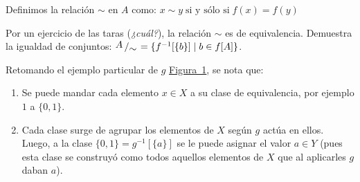 \documentclass[letterpaper,DIV=14,headsepline,12pt]{scrartcl}
\newcommand{\pts}{}
\newenvironment{ejercicio}[1]{\ifthenelse{\equal{#1}{1} \OR
\equal{#1}{+1}}{\renewcommand{\pts}{\textbf{(#1
pt)}}}{\renewcommand{\pts}{\textbf{(#1 pts)}}}\begin{ejj}\upshape
\pts}{\end{ejj}}
\newcommand{\quot}[2]{{\raisebox{.2em}{$#1$}\left/\raisebox{-.2em}{$#2$}\right.}}
\begin{document}
    \begin{definicion}
        Definimos la relación $\sim$ en $A$ como: $ x \sim y \; \text{si y sólo
        si} \; f(x)=f(y)$
    \end{definicion}

    \begin{ejercicio}{1.5}\label{ej:rela} Por un ejercicio de las taras
        (\textit{¿cuál?}), la relación $\sim$ es de equivalencia. Demuestra la
        igualdad de conjuntos: $\quot{A}{\sim}=\{ f^{-1}[\{b\}] \mid b \in f[A]
        \}$.
    \end{ejercicio}

    Retomando el ejemplo particular de $g$ \hyperref[fig:ejemplo]{Figura~1}, se
    nota que:
    \begin{enumerate}
        \item Se puede mandar cada elemento $x\in X$ a su clase de equivalencia,
        por ejemplo $1$ a $\{0,1\}$.
        \item Cada clase surge de agrupar los elementos de $X$ según $g$ actúa
        en ellos. Luego, a la clase $\{0,1\}=g^{-1}[\{a\}]$ se le puede asignar
        el valor $a \in Y$ (pues esta clase se construyó como todos aquellos
        elementos de $X$ que al aplicarles $g$ daban $a$).
    \end{enumerate}
\end{document}
